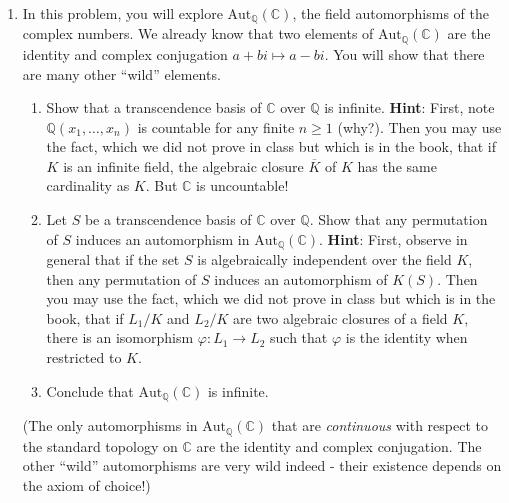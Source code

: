 \documentclass[11pt]{article}
\begin{document}
\begin{enumerate}
\item In this problem, you will explore $\mathrm{Aut}_{\mathbb{Q}}(\mathbb{C})$, the field automorphisms of the complex numbers. We already know that two elements of $\mathrm{Aut}_{\mathbb{Q}}(\mathbb{C})$ are the identity and complex conjugation $a+bi \mapsto a-bi$. You will show that there are many other ``wild'' elements.
\begin{enumerate}
\item Show that a transcendence basis of $\mathbb{C}$ over $\mathbb{Q}$ is infinite. {\bf Hint}: First, note $\mathbb{Q}(x_1,\ldots,x_n)$ is countable for any finite $n \geq 1$ (why?). Then you may use the fact, which we did not prove in class but which is in the book, that if $K$ is an infinite field, the algebraic closure $\overline{K}$ of $K$ has the same cardinality as $K$. But $\mathbb{C}$ is uncountable!
\item Let $S$ be a transcendence basis of $\mathbb{C}$ over $\mathbb{Q}$. Show that any permutation of $S$ induces an automorphism in $\mathrm{Aut}_{\mathbb{Q}}(\mathbb{C})$. {\bf Hint}: First, observe in general that if the set $S$ is algebraically independent over the field $K$, then any permutation of $S$ induces an automorphism of $K(S)$. Then you may use the fact, which we did not prove in class but which is in the book, that if $L_1/K$ and $L_2/K$ are two algebraic closures of a field $K$, there is an isomorphism $\varphi \colon L_1 \to L_2$ such that $\varphi$ is the identity when restricted to $K$.
\item Conclude that $\mathrm{Aut}_{\mathbb{Q}}(\mathbb{C})$ is infinite.
\end{enumerate}
(The only automorphisms in $\mathrm{Aut}_{\mathbb{Q}}(\mathbb{C})$ that are \emph{continuous} with respect to the standard topology on $\mathbb{C}$ are the identity and complex conjugation. The other ``wild'' automorphisms are very wild indeed - their existence depends on the axiom of choice!)

\end{enumerate}
\end{document}
